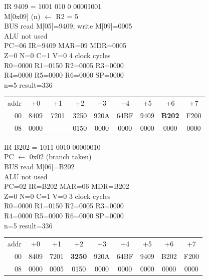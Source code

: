 \noindent\begin{tcolorbox}[stepbox, title={Step 16 \hfill PC 05 \quad ST R2, n}]
\textcolor{dim}{IR} 9409 = 1001 010 0 00001001\\
M[0x09] (n) $\leftarrow$ R2 = 5\\
\textcolor{dim}{BUS} read M[05]=9409, \textcolor{wrt}{write M[09]=0005}\\
\textcolor{dim}{ALU} \textcolor{dim}{not used}\\
PC=06 IR=9409 MAR=09 MDR=0005\\
Z=0 N=0 C=1 V=0 \hfill \textcolor{dim}{4 clock cycles}\\
R0=0000 R1=0150 R2=0005 R3=0000\\
R4=0000 R5=0000 R6=0000 SP=0000\\
\textcolor{dim}{n=5  result=336}\\[1pt]
{\setlength{\tabcolsep}{1.6pt}\begin{tabular}{@{}r*{8}{c}@{}}
\textcolor{dim}{addr} & \textcolor{dim}{+0} & \textcolor{dim}{+1} & \textcolor{dim}{+2} & \textcolor{dim}{+3} & \textcolor{dim}{+4} & \textcolor{dim}{+5} & \textcolor{dim}{+6} & \textcolor{dim}{+7}\\
\textcolor{dim}{00} & 8409 & 7201 & 3250 & 920A & 64BF & 9409 & \cellcolor{pcc}\textbf{B202} & F200\\
\textcolor{dim}{08} & 0000 & \cellcolor{wrt}\textcolor{white}{\textbf{0005}} & \cellcolor{datac}0150 & 0000 & 0000 & 0000 & 0000 & 0000\\
\end{tabular}}
\end{tcolorbox}\hfill\begin{tcolorbox}[stepbox, title={Step 17 \hfill PC 06 \quad BNE loop}]
\textcolor{dim}{IR} B202 = 1011 0010 00000010\\
PC $\leftarrow$ 0x02 (branch taken)\\
\textcolor{dim}{BUS} read M[06]=B202\\
\textcolor{dim}{ALU} \textcolor{dim}{not used}\\
PC=02 IR=B202 MAR=06 MDR=B202\\
Z=0 N=0 C=1 V=0 \hfill \textcolor{dim}{3 clock cycles}\\
R0=0000 R1=0150 R2=0005 R3=0000\\
R4=0000 R5=0000 R6=0000 SP=0000\\
\textcolor{dim}{n=5  result=336}\\[1pt]
{\setlength{\tabcolsep}{1.6pt}\begin{tabular}{@{}r*{8}{c}@{}}
\textcolor{dim}{addr} & \textcolor{dim}{+0} & \textcolor{dim}{+1} & \textcolor{dim}{+2} & \textcolor{dim}{+3} & \textcolor{dim}{+4} & \textcolor{dim}{+5} & \textcolor{dim}{+6} & \textcolor{dim}{+7}\\
\textcolor{dim}{00} & 8409 & 7201 & \cellcolor{pcc}\textbf{3250} & 920A & 64BF & 9409 & B202 & F200\\
\textcolor{dim}{08} & 0000 & \cellcolor{datac}0005 & \cellcolor{datac}0150 & 0000 & 0000 & 0000 & 0000 & 0000\\
\end{tabular}}
\end{tcolorbox}\par\vspace{3pt}
